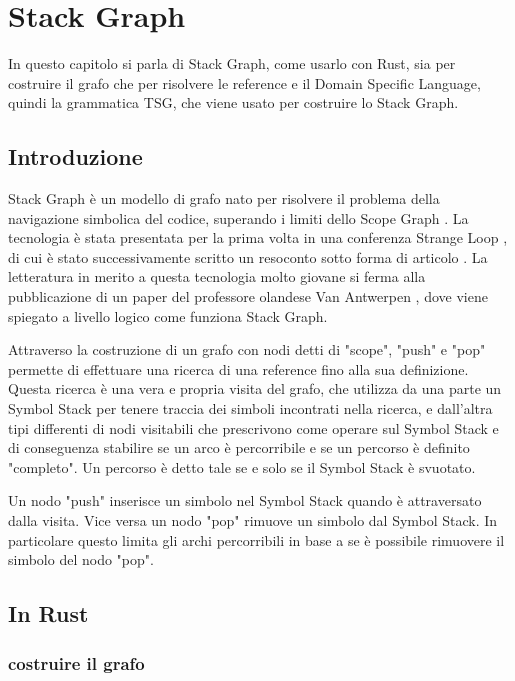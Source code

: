 \chapter{Stack Graph}

In questo capitolo si parla di Stack Graph, come usarlo con Rust, sia per costruire il grafo che per risolvere le reference e il Domain Specific Language, quindi la grammatica TSG, che viene usato per costruire lo Stack Graph.

\section{Introduzione}

Stack Graph \cite{StackGraph} \`e un modello di grafo nato per risolvere il problema della navigazione simbolica del codice, superando i limiti dello Scope Graph \cite{ScopeGraph}.
La tecnologia \`e stata presentata per la prima volta in una conferenza Strange Loop \cite{StackGraphConference}, di cui \`e stato successivamente scritto un resoconto sotto forma di articolo \cite{StackGraphIntro}.
La letteratura in merito a questa tecnologia molto giovane si ferma alla pubblicazione di un paper del professore olandese Van Antwerpen \cite{StackGraphNameResolutionAtScale}, dove viene spiegato a livello logico come funziona Stack Graph.

Attraverso la costruzione di un grafo con nodi detti di "scope", "push" e "pop" permette di effettuare una ricerca di una reference fino alla sua definizione.
Questa ricerca \`e una vera e propria visita del grafo, che utilizza da una parte un Symbol Stack per tenere traccia dei simboli incontrati nella ricerca, e dall'altra tipi differenti di nodi visitabili che prescrivono come operare sul Symbol Stack e di conseguenza stabilire se un arco \`e percorribile e se un percorso \`e definito "completo".
Un percorso \`e detto tale se e solo se il Symbol Stack \`e svuotato.

Un nodo "push" inserisce un simbolo nel Symbol Stack quando \`e attraversato dalla visita.
Vice versa un nodo "pop" rimuove un simbolo dal Symbol Stack.
In particolare questo limita gli archi percorribili in base a se \`e possibile rimuovere il simbolo del nodo "pop".

\section{In Rust}

\subsection{costruire il grafo}

